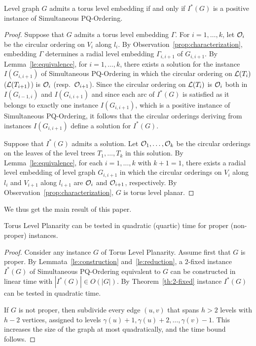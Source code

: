 \documentclass{llncs}
\begin{document}
\begin{lemma} \label{le:reduction}
Level graph $G$ admits a torus level embedding if and only if $I^*(G)$ is a positive instance of {\sc Simultaneous PQ-Ordering}.
\end{lemma}

\begin{proof}
Suppose that $G$ admits a torus level embedding $\Gamma$. For $i=1,\dots,k$, let ${\cal O}_i$ be the circular ordering on $V_i$ along $l_i$. By Observation~\ref{prop:characterization}, embedding $\Gamma$ determines a radial level embedding $\Gamma_{i,i+1}$ of $G_{i,i+1}$. By Lemma~\ref{le:equivalence}, for $i=1,\dots,k$, there exists a solution for the instance $I(G_{i,i+1})$ of {\sc Simultaneous PQ-Ordering} in which the circular ordering on ${\cal L}(T_i)$ (${\cal L}(T_{i+1})$) is ${\cal O}_i$ (resp.\ ${\cal O}_{i+1}$). Since the circular ordering on ${\cal L}(T_i)$ is ${\cal O}_i$ both in $I(G_{i-1,i})$ and $I(G_{i,i+1})$ and since each arc of $I^*(G)$ is satisfied as it belongs to exactly one instance $I(G_{i,i+1})$, which is a positive instance of {\sc Simultaneous PQ-Ordering}, it follows that the circular orderings deriving from instances $I(G_{i,i+1})$ define a solution for $I^*(G)$. 

Suppose that $I^*(G)$ admits a solution. Let ${\cal O}_1,\dots,{\cal O}_k$ be the circular orderings on the leaves of the level trees $T_1,\dots,T_k$ in this solution. By Lemma~\ref{le:equivalence}, for each $i=1,\dots, k$ with $k+1=1$, there exists a radial level embedding of level graph
$G_{i,i+1}$ in which the circular orderings on $V_i$ along $l_i$ and $V_{i+1}$ along $l_{i+1}$ are ${\cal O}_{i}$ and ${\cal O}_{i+1}$, respectively. By Observation~\ref{prop:characterization}, $G$ is torus level planar. 
\end{proof}

We thus get the main result of this paper.

\begin{theorem}\label{th:torus}
{\sc Torus Level Planarity} can be tested in quadratic (quartic) time for proper (non-proper) instances.
\end{theorem}

\begin{proof}
Consider any instance $G$ of {\sc Torus Level Planarity}. Assume first that $G$ is proper. By Lemmata~\ref{le:construction} and~\ref{le:reduction}, a $2$-fixed instance $I^*(G)$ of {\sc Simultaneous PQ-Ordering} equivalent to $G$ can be constructed in linear time with $|I^*(G)| \in O(|G|)$. By Theorem~\ref{th:2-fixed} instance $I^*(G)$ can be tested in quadratic time.

If $G$ is not proper, then subdivide every edge $(u,v)$ that spans $h>2$ levels with $h-2$ vertices, assigned to levels $\gamma(u)+1,\gamma(u)+2,\dots,\gamma(v)-1$. This increases the size of the graph at most quadratically, and the time bound follows.
\end{proof}
\end{document}
